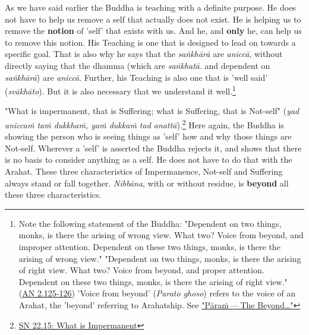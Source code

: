As we have said earlier the Buddha is teaching with a definite purpose. He does not have to help us remove a self that actually does not exist. He is helping us to remove the \textbf{notion} of 'self' that exists with us. And he, and \textbf{only} he, can help us to remove this notion. His Teaching is one that is designed to lead on towards a specific goal. That is also why he says that the \emph{saṅkhārā} are \emph{aniccā}, without directly saying that the dhamma (which are \emph{saṅkhatā}. and dependent on \emph{saṅkhārā}) are \emph{aniccā}. Further, his Teaching is also one that is 'well said' (\emph{svākhāto}). But it is also necessary that we understand it well.\footnote{Note the following statement of the Buddha: "Dependent on two things, monks, is there the arising of wrong view. What two? Voice from beyond, and improper attention. Dependent on these two things, monks, is there the arising of wrong view." "Dependent on two things, monks, is there the arising of right view. What two? Voice from beyond, and proper attention. Dependent on these two things, monks, is there the arising of right view." (\href{https://suttacentral.net/an2.118-129/en/sujato}{AN 2.125-126}) 'Voice from beyond' (\emph{Parato ghoso}) refers to the voice of an Arahat, the 'beyond' referring to Arahatship. See \protect\hyperlink{beyond}{"Pāraṁ --- The Beyond\ldots\hspace{0pt}"}}

"What is impermanent, that is Suffering; what is Suffering, that is Not-self" (\emph{yad aniccaṁ taṁ dukkhaṁ, yaṁ dukkaṁ tad anattā}).\footnote{\href{https://suttacentral.net/sn22.15/en/bodhi}{SN 22.15: What is Impermanent}} Here again, the Buddha is showing the person who is seeing things as 'self' how and why those things are Not-self. Wherever a 'self' is asserted the Buddha rejects it, and shows that there is no basis to consider anything as a self. He does not have to do that with the Arahat. These three characteristics of Impermanence, Not-self and Suffering always stand or fall together. \emph{Nibbāna}, with or without residue, is \textbf{beyond} all these three characteristics.

